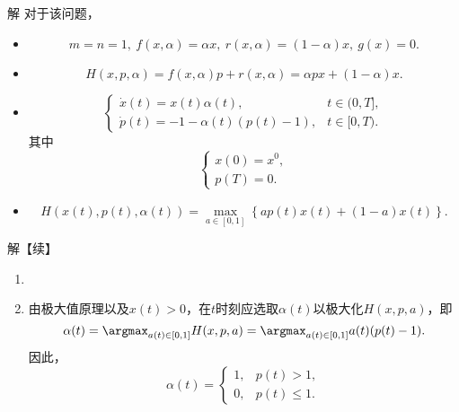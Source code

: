 \begin{frame}{\subsecname}
\begin{block}{解}
对于该问题，
\begin{itemize}
\item {}
$$
m=n=1, ~
f(x,\alpha)=\alpha x, ~
r(x,\alpha)=(1-\alpha)x, ~
g(x) = 0.
$$
\item {}
$$
H(x,p,\alpha) = f(x,\alpha) p + r(x,\alpha) = \alpha p x + (1-\alpha)x.
$$
\item {}
\begin{equation}
    \left\{
    \begin{array}{ll}
        \dot x(t) %
        = x(t)\alpha(t),  &  t \in (0,T], \\[.1in]
        \dot p(t) %
        =-1-\alpha(t)(p(t)-1),  &  t \in [0,T). 
    \end{array}
    \right.
\end{equation}
其中 
\begin{equation}
\left\{
\begin{array}{l}
    x(0) = x^0,  \\[0.05in]
    p(T) %
    = 0.
\end{array}
\right.
\end{equation}
\item {}
$$
H(x(t),p(t),\alpha(t)) = \max_{a\in [0,1]} \left\{a p(t)x(t)  + (1-a)x(t)\right\}. 
$$
\end{itemize}
\end{block}
\end{frame}

\begin{frame}{\subsecname}
\begin{block}{解【续】}
\begin{enumerate}
\item {}
\item[] 
由极大值原理以及$x(t) >0$，在$t$时刻应选取$\alpha(t)$以极大化$H(x,p,a)$，即
$$
\alpha(t) = \argmax_{a(t) \in [0,1]} H(x,p,a) = \argmax_{a(t) \in [0,1]} a(t)(p(t)-1). 
$$
因此，
\begin{equation}\label{eq:alpha_p_ex1}
\alpha(t) = \left\{
\begin{array}{cl}
    1, &  p(t) > 1, \\[.05in]
    0, &  p(t) \le 1.
\end{array}
\right.
\end{equation}
\end{enumerate}
\end{block}
\end{frame}

